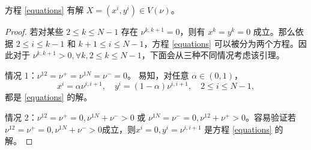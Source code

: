 \begin{lemma}\label{lemma:existence for equations solution}
	方程 \eqref{equations} 有解 $X=(x^i,y^i)\in V(\nu)$。
\end{lemma}
\begin{proof}
    若对某些 $2\le k\le N-1$ 存在 $\nu^{k,k+1}=0$，则有 $x^{k}=y^{k}=0$ 成立。那么依据 $2\le i\le k-1$ 和 $k+1\le i\le N-1$，方程 \eqref{equations} 可以被分为两个方程。因此对于 $\nu^{k,k+1}>0, \forall k, 2\le k\le N-1$，下面会从三种不同情况考虑该引理。

    情况 1：$\nu^{12}=\nu^{+}=\nu^{1N}=\nu^-=0$。
    易知，对任意 $\alpha\in (0,1)$，
    \begin{equation*}
        x^{i}=\alpha\nu^{i,i+1},\quad y^{i}=(1-\alpha)\nu^{i,i+1},\quad 2\le i\le N-1,
    \end{equation*}
    都是 \eqref{equations} 的解。

    情况 2：$\nu^{12}=\nu^{+}=0,\nu^{1N}+\nu^{-}>0$ 或 $\nu^{1N}=\nu^{-}=0,\nu^{12}+\nu^{+}>0$。容易验证若 $\nu^{12}=\nu^{+}=0,\nu^{1N}+\nu^{-}>0$成立，则$x^{i}=0,y^{i}=\nu^{i,i+1}$ 是方程 \eqref{equations} 的解。


\end{proof}
